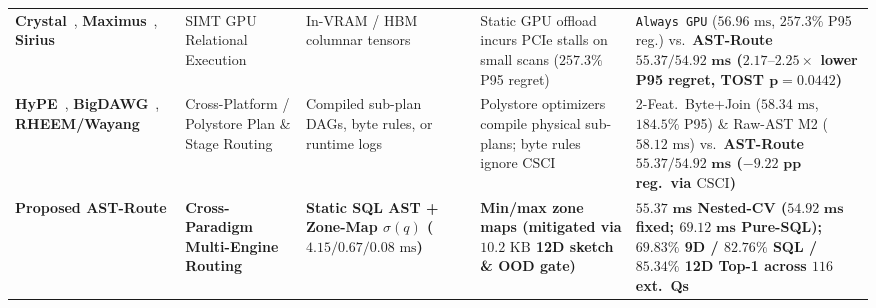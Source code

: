 \documentclass[10pt,a4paper]{article}
\newenvironment{fitasttable}{%
  \begin{lrbox}{\asttblbox}%
}{%
  \end{lrbox}%
  \sbox{\asttblboxB}{%
    \ifdim\wd\asttblbox>0.96\textwidth
      \resizebox{0.96\textwidth}{!}{\usebox{\asttblbox}}%
    \else
      \usebox{\asttblbox}%
    \fi
  }%
  \ifdim\ht\asttblboxB>0.72\textheight
    \resizebox{!}{0.72\textheight}{\usebox{\asttblboxB}}%
  \else
    \usebox{\asttblboxB}%
  \fi
}
\begin{document}
\begin{table}[!t]
\begin{fitasttable}
\begin{tabular}{@{}p{2.6cm}p{2.2cm}p{2.7cm}p{3.9cm}p{4.6cm}@{}}
\textbf{Crystal}~\cite{shanbhag2020crystal}, \textbf{Maximus}~\cite{kabic2025maximus}, \textbf{Sirius}~\cite{yogatama2025sirius} & SIMT GPU Relational Execution & In-VRAM / HBM columnar tensors & Static GPU offload incurs PCIe stalls on small scans ($257.3\%$ P95 regret) & \texttt{Always GPU} ($56.96\text{ ms}$, $257.3\%$ P95 reg.) vs.\ \textbf{AST-Route $\mathbf{55.37 / 54.92\text{ ms}}$ ($\mathbf{2.17\text{--}2.25\times}$ lower P95 regret, TOST $\mathbf{p=0.0442}$)} \\
\textbf{HyPE}~\cite{bress2013hype}, \textbf{BigDAWG}~\cite{tan2023stage}, \textbf{RHEEM/Wayang}~\cite{gupta2023adaptive} & Cross-Platform / Polystore Plan \& Stage Routing & Compiled sub-plan DAGs, byte rules, or runtime logs & Polystore optimizers compile physical sub-plans; byte rules ignore $\text{CSCI}$ & 2-Feat.\ Byte+Join ($58.34\text{ ms}$, $184.5\%$ P95) \& Raw-AST M2 ($58.12\text{ ms}$) vs.\ \textbf{AST-Route $\mathbf{55.37 / 54.92\text{ ms}}$ ($\mathbf{-9.22\text{ pp}}$ reg.\ via $\text{CSCI}$)} \\
\midrule
\textbf{Proposed AST-Route} & \textbf{Cross-Paradigm Multi-Engine Routing} & \textbf{Static SQL AST + Zone-Map $\hat{\sigma}(q)$ ($4.15 / 0.67 / 0.08\text{ ms}$)} & \textbf{Min/max zone maps (mitigated via $10.2\text{ KB}$ 12D sketch \& OOD gate)} & \textbf{$\mathbf{55.37\text{ ms}}$ Nested-CV ($\mathbf{54.92\text{ ms}}$ fixed; $\mathbf{69.12\text{ ms}}$ Pure-SQL); $\mathbf{69.83\%}$ 9D / $\mathbf{82.76\%}$ SQL / $\mathbf{85.34\%}$ 12D Top-1 across $116$ ext.\ Qs} \\
\bottomrule
\end{tabular}
\end{fitasttable}%
\endgroup
\end{table}
\end{document}
